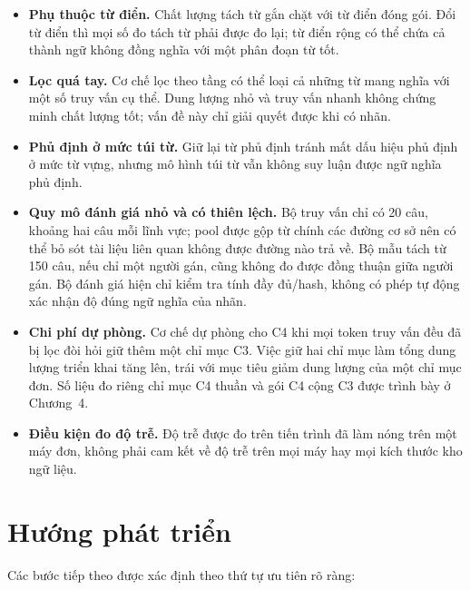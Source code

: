 \begin{itemize}
  \item \textbf{Phụ thuộc từ điển.} Chất lượng tách từ gắn chặt với từ điển đóng
        gói. Đổi từ điển thì mọi số đo tách từ phải được đo lại; từ điển rộng có
        thể chứa cả thành ngữ không đồng nghĩa với một phân đoạn từ tốt.
  \item \textbf{Lọc quá tay.} Cơ chế lọc theo tầng có thể loại cả những từ mang
        nghĩa với một số truy vấn cụ thể. Dung lượng nhỏ và truy vấn nhanh không
        chứng minh chất lượng tốt; vấn đề này chỉ giải quyết được khi có nhãn.
  \item \textbf{Phủ định ở mức túi từ.} Giữ lại từ phủ định tránh mất dấu hiệu phủ
        định ở mức từ vựng, nhưng mô hình túi từ vẫn không suy luận được ngữ nghĩa
        phủ định.
  \item \textbf{Quy mô đánh giá nhỏ và có thiên lệch.} Bộ truy vấn chỉ có 20 câu,
        khoảng hai câu mỗi lĩnh vực; pool được gộp từ chính các đường cơ sở nên có
        thể bỏ sót tài liệu liên quan không được đường nào trả về. Bộ mẫu tách từ
        150 câu, nếu chỉ một người gán, cũng không đo được đồng thuận giữa người gán.
        Bộ đánh giá hiện chỉ kiểm tra tính đầy đủ/hash, không có phép tự động
        xác nhận độ đúng ngữ nghĩa của nhãn.
  \item \textbf{Chi phí dự phòng.} Cơ chế dự phòng cho C4 khi mọi token truy vấn
        đều đã bị lọc đòi hỏi giữ thêm một chỉ mục C3. Việc giữ hai chỉ mục làm
        tổng dung lượng triển khai tăng lên, trái với mục tiêu giảm dung lượng của
        một chỉ mục đơn. Số liệu đo riêng chỉ mục C4 thuần và gói C4 cộng C3 được
        trình bày ở Chương~4.
  \item \textbf{Điều kiện đo độ trễ.} Độ trễ được đo trên tiến trình đã làm nóng
        trên một máy đơn, không phải cam kết về độ trễ trên mọi máy hay mọi kích
        thước kho ngữ liệu.
\end{itemize}

\section{Hướng phát triển}

Các bước tiếp theo được xác định theo thứ tự ưu tiên rõ ràng:

